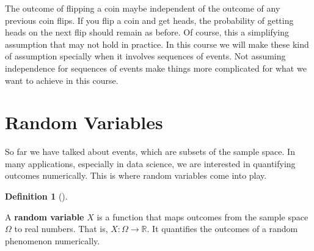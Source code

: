 \documentclass[
  letterpaper,
  DIV=11,
  numbers=noendperiod]{scrreport}
\theoremstyle{definition}
\theoremstyle{plain}
\theoremstyle{plain}
\theoremstyle{definition}
\newtheorem{definition}{Definition}[chapter]
\theoremstyle{remark}
\begin{document}
\begin{tcolorbox}[enhanced jigsaw, opacitybacktitle=0.6, bottomtitle=1mm, opacityback=0, toprule=.15mm, colbacktitle=quarto-callout-note-color!10!white, colback=white, left=2mm, title=\textcolor{quarto-callout-note-color}{\faInfo}\hspace{0.5em}{Note}, breakable, rightrule=.15mm, leftrule=.75mm, titlerule=0mm, colframe=quarto-callout-note-color-frame, arc=.35mm, coltitle=black, toptitle=1mm, bottomrule=.15mm]

The outcome of flipping a coin maybe independent of the outcome of any
previous coin flips. If you flip a coin and get heads, the probability
of getting heads on the next flip should remain as before. Of course,
this a simplifying assumption that may not hold in practice. In this
course we will make these kind of assumption specially when it involves
sequences of events. Not assuming independence for sequences of events
make things more complicated for what we want to achieve in this course.

\end{tcolorbox}

\section{Random Variables}\label{random-variables}

So far we have talked about events, which are subsets of the sample
space. In many applications, especially in data science, we are
interested in quantifying outcomes numerically. This is where random
variables come into play.

\begin{tcolorbox}[enhanced jigsaw, opacitybacktitle=0.6, bottomtitle=1mm, opacityback=0, toprule=.15mm, colbacktitle=quarto-callout-note-color!10!white, colback=white, left=2mm, title={Random Variable}, breakable, rightrule=.15mm, leftrule=.75mm, titlerule=0mm, colframe=quarto-callout-note-color-frame, arc=.35mm, coltitle=black, toptitle=1mm, bottomrule=.15mm]

\begin{definition}[]\protect\hypertarget{def-random-variable}{}\label{def-random-variable}

A \textbf{random variable} \(X\) is a function that maps outcomes from
the sample space \(\Omega\) to real numbers. That is,
\(X: \Omega \to \mathbb{R}\). It quantifies the outcomes of a random
phenomenon numerically.

\end{definition}

\end{tcolorbox}
\end{document}
